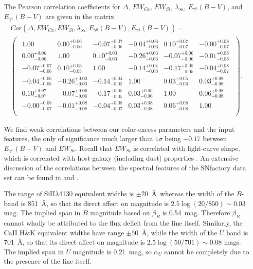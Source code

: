 \documentclass{aastex61}   	%
\begin{document}
The Pearson correlation coefficients for $\Delta$, $EW_{Ca}$, $EW_{Si}$, $\lambda_{Si}$, $E_{\gamma^0}(B-V)$, and $E_{\gamma^0}(B-V)$ are given in the matrix
\color{orange}
\begin{multline}
Cor(\Delta, EW_{Ca}, EW_{Si}, \lambda_{Si}, E_{\gamma^0}(B-V), E_{\gamma^1}(B-V)) =\\
\begin{pmatrix}
\begin{array}{rrrrrr}
1.00 & 0.00^{+0.06}_{-0.06} & -0.07^{+0.07}_{-0.06} & -0.04^{+0.06}_{-0.06} & 0.10^{+0.07}_{-0.07} & -0.00^{+0.08}_{-0.07} \\
0.00^{+0.06}_{-0.06} & 1.00 & 0.10^{+0.03}_{-0.03} & -0.26^{+0.03}_{-0.03} & -0.07^{+0.06}_{-0.06} & -0.01^{+0.08}_{-0.08} \\
-0.07^{+0.07}_{-0.06} & 0.10^{+0.03}_{-0.03} & 1.00 & -0.14^{+0.04}_{-0.03} & -0.17^{+0.05}_{-0.05} & -0.04^{+0.08}_{-0.07} \\
-0.04^{+0.06}_{-0.06} & -0.26^{+0.03}_{-0.03} & -0.14^{+0.04}_{-0.03} & 1.00 & 0.03^{+0.05}_{-0.06} & 0.03^{+0.08}_{-0.08} \\
0.10^{+0.07}_{-0.07} & -0.07^{+0.06}_{-0.06} & -0.17^{+0.05}_{-0.05} & 0.03^{+0.05}_{-0.06} & 1.00 & 0.06^{+0.08}_{-0.08} \\
-0.00^{+0.08}_{-0.07} & -0.01^{+0.08}_{-0.08} & -0.04^{+0.08}_{-0.07} & 0.03^{+0.08}_{-0.08} & 0.06^{+0.08}_{-0.08} & 1.00 \\
\end{array}
\end{pmatrix}.
\end{multline}
\color{black}

We find weak correlations between our color-excess parameters and the input features, the 
\color{orange}
only of significance much larger than $1 \sigma$
\color{black}
being
$-0.17$
 between
$E_{\gamma^0}(B-V)$ and $EW_{Si}$.
Recall that $EW_{Si}$ is correlated with light-curve shape, which is correlated with host-galaxy (including dust) properties 
\citep{2000AJ....120.1479H, 2003MNRAS.340.1057S}.
An extensive discussion of the correlations between the spectral features of the SNfactory data set can be found in \citet{chotard:thesis}
and \citet{leget:thesis}.

The range of SiII$\lambda$4130 equivalent widths is $\pm 20$~\AA\ whereas the width of the $B$-band is 851~\AA, so that its direct affect on magnitude
is
$2.5 \log{(20/850)} \sim 0.03$ mag.  
The implied span in $B$ magnitude based on $\beta_B$ is 0.54~mag.  Therefore $\beta_B$ cannot wholly be attributed to the flux deficit
from the line itself.
Similarly, the CaII H\&K equivalent widths have range $\pm 50$~\AA, while the width of the $U$ band is
701~\AA, so that its direct affect on magnitude
is
$2.5 \log{(50/701)} \sim 0.08$ mags.   The implied span in $U$ magnitude is  0.21~mag, so $\alpha_U$ cannot be completely due to the 
presence of the line itself.
\end{document}
